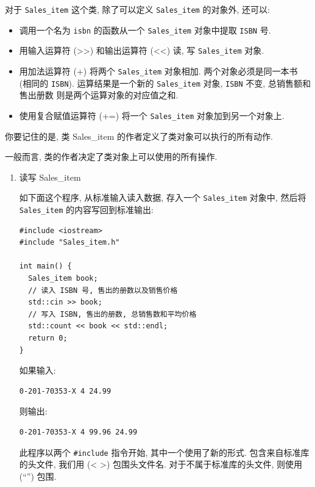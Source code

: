 \documentclass[lang=cn]{elegantbook}
\begin{document}
对于 \texttt{Sales\_item} 这个类, 除了可以定义 \texttt{Sales\_item} 的对象外, 还可以:

\begin{itemize}
\item 调用一个名为 \texttt{isbn} 的函数从一个 \texttt{Sales\_item} 对象中提取 \texttt{ISBN} 号.
\item 用输入运算符 (>>) 和输出运算符 (<<) 读, 写 \texttt{Sales\_item} 对象.
\item 用加法运算符 (+) 将两个 \texttt{Sales\_item} 对象相加. 两个对象必须是同一本书 (相同的
\texttt{ISBN}). 运算结果是一个新的 \texttt{Sales\_item} 对象, \texttt{ISBN} 不变, 总销售额和售出册数
则是两个运算对象的对应值之和.
\item 使用复合赋值运算符 (+=) 将一个 \texttt{Sales\_item} 对象加到另一个对象上.
\end{itemize}

\vspace*{1\baselineskip}
\begin{definition}[类定义了行为]
你要记住的是, 类 Sales\_item 的作者定义了类对象可以执行的所有动作.

一般而言, 类的作者决定了类对象上可以使用的所有操作.
\end{definition}

\begin{enumerate}
\item 读写 Sales\_item
\label{sec:org48240f7}

如下面这个程序, 从标准输入读入数据, 存入一个 \texttt{Sales\_item} 对象中, 然后将
\texttt{Sales\_item} 的内容写回到标准输出:

\begin{verbatim}
#include <iostream>
#include "Sales_item.h"

int main() {
  Sales_item book;
  // 读入 ISBN 号, 售出的册数以及销售价格
  std::cin >> book;
  // 写入 ISBN, 售出的册数, 总销售数和平均价格
  std::count << book << std::endl;
  return 0;
}
\end{verbatim}

如果输入:

\begin{verbatim}
0-201-70353-X 4 24.99
\end{verbatim}

则输出:
\begin{verbatim}
0-201-70353-X 4 99.96 24.99
\end{verbatim}

此程序以两个 \texttt{\#include} 指令开始, 其中一个使用了新的形式. 包含来自标准库的头文件,
我们用 (< >) 包围头文件名. 对于不属于标准库的头文件, 则使用 (``'') 包围.

\vspace*{1\baselineskip}
\end{enumerate}
\end{document}
